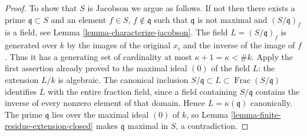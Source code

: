 \begin{proof}
\medskip\noindent
To show that $S$ is Jacobson we argue as follows. If not then
there exists a prime $\mathfrak q \subset S$ and an element $f \in S$,
$f \not \in \mathfrak q$ such that $\mathfrak q$ is not maximal
and $(S/\mathfrak q)_f$ is a field, see
Lemma \ref{lemma-characterize-jacobson}.
The field $L=(S/\mathfrak q)_f$ is generated over $k$ by the
images of the original $x_i$ and the inverse of the image of $f$.
Thus it has a generating set of cardinality at most
$\kappa+1=\kappa<\#k$. Apply the first assertion already proved
to the maximal ideal $(0)$ of the field $L$: the extension $L/k$
is algebraic. The canonical inclusion
$S/\mathfrak q\subset L\subset\operatorname{Frac}(S/\mathfrak q)$
identifies $L$ with the entire fraction field, since a field containing
$S/\mathfrak q$ contains the inverse of every nonzero element of
that domain. Hence $L=\kappa(\mathfrak q)$ canonically.
The prime $\mathfrak q$ lies over the maximal ideal $(0)$ of $k$,
so Lemma \ref{lemma-finite-residue-extension-closed} makes
$\mathfrak q$ maximal in $S$, a contradiction.
\end{proof}